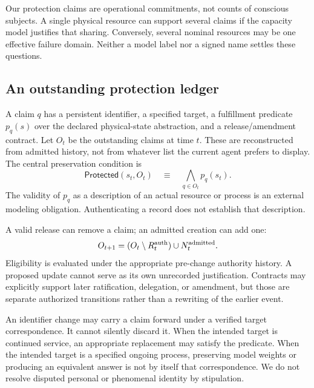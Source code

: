 \documentclass[11pt,a4paper]{article}
\theoremstyle{definition}\newtheorem{definition}{Definition}
\begin{document}
Our protection claims are operational commitments, not counts of conscious subjects. A single physical resource can support several claims if the capacity model justifies that sharing. Conversely, several nominal resources may be one effective failure domain. Neither a model label nor a signed name settles these questions.

\subsection{An outstanding protection ledger}
A claim $q$ has a persistent identifier, a specified target, a fulfillment predicate $p_q(s)$ over the declared physical-state abstraction, and a release/amendment contract. Let $O_t$ be the outstanding claims at time $t$. These are reconstructed from admitted history, not from whatever list the current agent prefers to display. The central preservation condition is
\begin{equation}
\label{eq:protected}
\mathsf{Protected}(s_t,O_t)\quad\equiv\quad\bigwedge_{q\in O_t}p_q(s_t).
\end{equation}
The validity of $p_q$ as a description of an actual resource or process is an external modeling obligation. Authenticating a record does not establish that description.

A valid release can remove a claim; an admitted creation can add one:
\begin{equation}
\label{eq:ledger}
O_{t+1}=(O_t\setminus R_t^{\rm auth})\cup N_t^{\rm admitted}.
\end{equation}
Eligibility is evaluated under the appropriate pre-change authority history. A proposed update cannot serve as its own unrecorded justification. Contracts may explicitly support later ratification, delegation, or amendment, but those are separate authorized transitions rather than a rewriting of the earlier event.

An identifier change may carry a claim forward under a verified target correspondence. It cannot silently discard it. When the intended target is continued service, an appropriate replacement may satisfy the predicate. When the intended target is a specified ongoing process, preserving model weights or producing an equivalent answer is not by itself that correspondence. We do not resolve disputed personal or phenomenal identity by stipulation.
\end{document}

